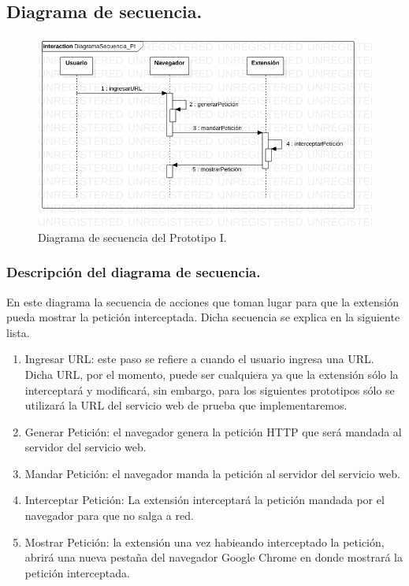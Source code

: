 \documentclass[12pt, a4paper, titlepage]{report}
\begin{document}
			\subsection{Diagrama de secuencia.}
		    	\begin{figure}[H]
				    \begin{center} \includegraphics[width=15cm]{./imagenes/Desarrollo/Prototipo_1/SD_P1.png}
				    \caption{Diagrama de secuencia del Prototipo I.}
			        \end{center}
			    \end{figure}
			    
			    \subsubsection{Descripción del diagrama de secuencia.}
			    En este diagrama la secuencia de acciones que toman lugar para que la extensión pueda mostrar la petición interceptada. Dicha secuencia se explica en la siguiente lista.
			    \begin{enumerate}
			        \item Ingresar URL: este paso se refiere a cuando el usuario ingresa una URL. Dicha URL, por el momento, puede ser cualquiera ya que la extensión sólo la interceptará y modificará, sin embargo, para los siguientes prototipos sólo se utilizará la URL del servicio web de prueba que implementaremos.
			        \item Generar Petición: el navegador genera la petición HTTP que será mandada al servidor del servicio web. 
			        \item Mandar Petición: el navegador manda la petición al servidor del servicio web.
			        \item Interceptar Petición: La extensión interceptará la petición mandada por el navegador para que no salga a red.
			        \item Mostrar Petición: la extensión una vez habieando interceptado la petición, abrirá una nueva pestaña del navegador Google Chrome en donde mostrará la petición interceptada.
			    \end{enumerate}
            			        
\end{document}

